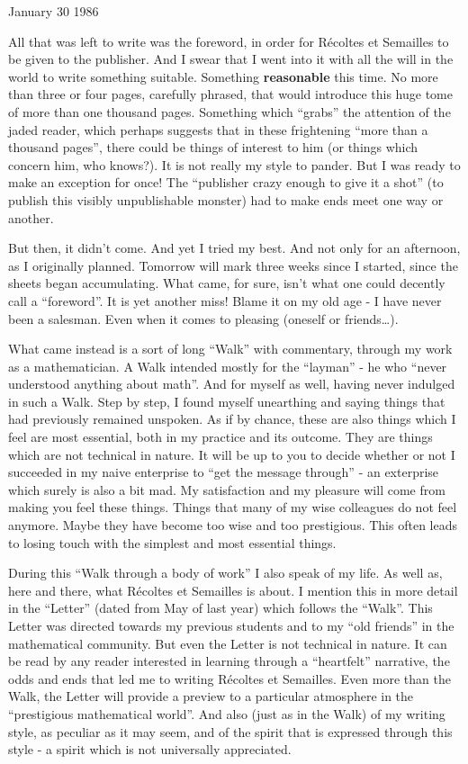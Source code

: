 January 30 1986

All that was left to write was the foreword, in order for
R\'ecoltes et Semailles to be given to the publisher.
And I swear that I went into it with all the will in the world to write something suitable. 
Something \textbf{reasonable} this time. No more than three or four pages, carefully phrased, that would introduce this huge tome of more than one thousand
pages. Something which ``grabs'' the attention of the jaded reader, 
which perhaps suggests that in these frightening ``more than a thousand pages'', there
could be things of interest to him (or things which concern him, who knows?). It is not
really my style to pander. But I was ready to make an exception for once!
The ``publisher crazy enough to give it a shot'' (to publish this visibly unpublishable
monster) had to make ends meet one way or another. 

But then, it didn't come. And yet I tried my best. And not only for an afternoon, as I
originally planned. Tomorrow will mark three weeks since I started, since the sheets began
accumulating.
What came, for sure, isn't what one could decently call a ``foreword''.
It is yet another miss! Blame it on my old age - I have never been a salesman. Even when
it comes to pleasing (oneself or friends\ldots).

What came instead is a sort of long ``Walk'' with commentary, through my work as a mathematician. 
A Walk intended mostly for the ``layman'' - he who ``never understood anything about
math''. And for myself as well, having never indulged in such a Walk. 
Step by step, I found myself unearthing and saying things that had previously remained
unspoken. As if by chance, these are also things which I feel are most essential, both in
my practice and its outcome. 
They are things which are not technical in nature. It will be up to you to decide whether
or not I succeeded in my naive enterprise to ``get the message through'' - an exterprise
which surely is also a bit mad. 
My satisfaction and my pleasure will come from making you feel these things. 
Things that many of my wise colleagues do not feel anymore. Maybe they have become too wise
and too prestigious.
This often leads to losing touch with the simplest and most essential things. 

During this ``Walk through a body of work'' 
I also speak of my life.
As well as, here and there, what 
R\'ecoltes et Semailles 
is about.
I mention this in more detail in the ``Letter'' 
(dated from May of last year) which
follows the ``Walk''. 
This Letter was directed towards my
previous students and to my ``old friends'' in the mathematical community. 
But even the Letter is not technical in nature. 
It can be read by any 
reader interested in learning 
through a ``heartfelt'' narrative, the odds and ends that led me to writing 
R\'ecoltes et Semailles. Even more than the Walk, the Letter will provide a 
preview to a particular atmosphere in the ``prestigious mathematical world''.
And also (just as in the Walk) of my writing style, as peculiar as it may seem, and of the
spirit that is expressed through this style - a spirit which is not universally
appreciated. 


